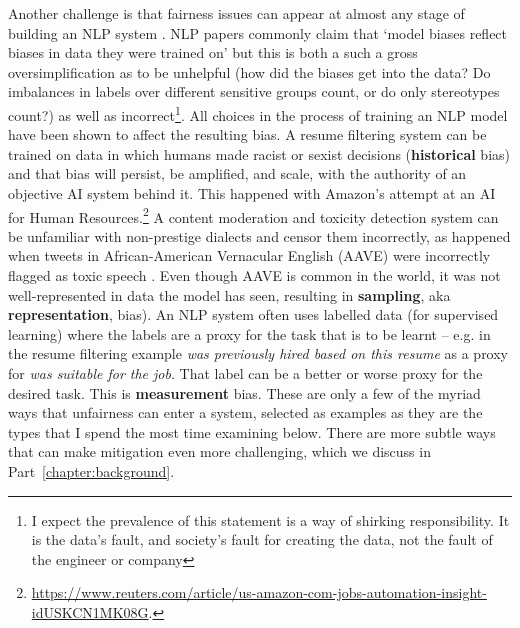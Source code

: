 Another challenge is that fairness issues can appear at almost any stage of building an NLP system \citep{suresh2021framework}. NLP papers commonly claim that `model biases reflect biases in data they were trained on' but this is both a such a gross oversimplification as to be unhelpful (how did the biases get into the data? Do imbalances in labels over different sensitive groups count, or do only stereotypes count?) as well as incorrect\footnote{I expect the prevalence of this statement is a way of shirking responsibility. It is the data's fault, and society's fault for creating the data, not the fault of the engineer or company}. All choices in the process of training an NLP model have been shown to affect the resulting bias. A resume filtering system can be trained on data in which humans made racist or sexist decisions (\textbf{historical} bias) and that bias will persist, be amplified, and scale, with the authority of an objective AI system behind it. This happened with Amazon's attempt at an AI for Human Resources.\footnote{ \url{https://www.reuters.com/article/us-amazon-com-jobs-automation-insight-idUSKCN1MK08G}.} A content moderation and toxicity detection system can be unfamiliar with non-prestige dialects and censor them incorrectly, as happened when tweets in African-American Vernacular English (AAVE) were incorrectly flagged as toxic speech \citep{sap-etal-2019-risk}. Even though AAVE is common in the world, it was not well-represented in data the model has seen, resulting in \textbf{sampling}, aka \textbf{representation}, bias). An NLP system often uses labelled data (for supervised learning) where the labels are a proxy for the task that is to be learnt -- e.g. in the resume filtering example \textit{was previously hired based on this resume} as a proxy for \textit{was suitable for the job}. That label can be a better or worse proxy for the desired task. This is \textbf{measurement} bias. These are only a few of the myriad ways that unfairness can enter a system, selected as examples as they are the types that I spend the most time examining below. There are more subtle ways that can make mitigation even more challenging, which we discuss in Part~\ref{chapter:background}.





